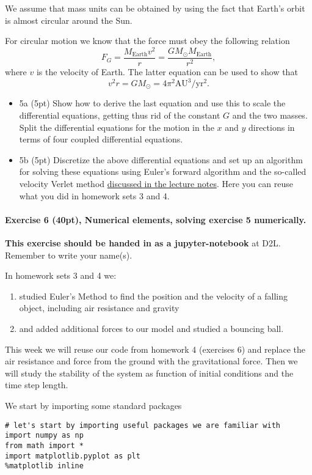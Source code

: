 \documentclass[%
oneside,                 %
final,                   %
10pt]{article}
\begin{document}
We assume that mass units can be obtained by using the fact that
Earth's orbit is almost circular around the Sun.

For circular motion we know that the force must obey the following relation
\[
F_G= \frac{M_{\mathrm{Earth}}v^2}{r}=\frac{GM_{\odot}M_{\mathrm{Earth}}}{r^2},
\]
where $v$ is the velocity of Earth. 
The latter equation can be used to show that
\[
v^2r=GM_{\odot}=4\pi^2\mathrm{AU}^3/\mathrm{yr}^2.
\]
\begin{itemize}
\item 5a (5pt) Show how to derive the last equation and use this to scale the differential equations, getting thus rid of the constant $G$ and the two masses. Split the differential equations for the motion in the $x$ and $y$ directions in terms of four coupled differential equations.

\item 5b (5pt)  Discretize the above differential equations and set up an algorithm for solving these equations using Euler's forward algorithm and the so-called velocity Verlet method \href{{https://mhjensen.github.io/Physics321/doc/pub/week7/html/week7.html}}{discussed in the lecture notes}. Here you can reuse what you did in homework sets 3 and 4.
\end{itemize}

\noindent
\paragraph{Exercise 6 (40pt), Numerical elements, solving exercise 5 numerically.}
\textbf{This exercise should be handed in as a jupyter-notebook} at D2L. Remember to write your name(s). 

In homework sets 3 and 4 we:
\begin{enumerate}
\item studied  Euler's Method to find the position and the velocity of a falling object, including air resistance and gravity

\item and added additional forces to our model and studied a bouncing ball.
\end{enumerate}

\noindent
This week we will reuse our code from homework 4 (exercises 6)
and replace the air resistance and force from the ground with the
gravitational force. Then we will study the stability of the system as function of initial conditions and the time step length.

We start by importing some standard packages
\begin{verbatim}
# let's start by importing useful packages we are familiar with
import numpy as np
from math import *
import matplotlib.pyplot as plt
%matplotlib inline
\end{verbatim}
\end{document}
